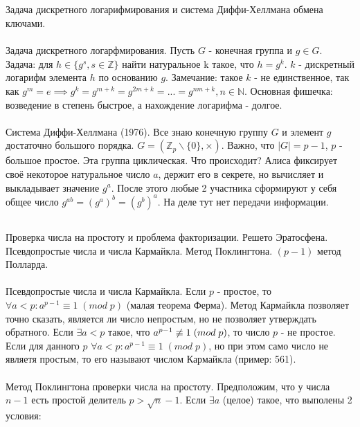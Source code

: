 \documentclass[a4paper,10pt]{article} %
\begin{document}
	\subsection{}
	Задача дискретного логарифмирования и система Диффи-Хеллмана обмена ключами.
	\\\\
	Задача дискретного логарфмирования. Пусть $G$ - конечная группа и $g \in G$.
	Задача: для $h \in \{g^{s}, s \in \mathbb{Z}\}$ найти натуральное k такое, что
	$h = g^{k}$. $k$ - дискретный логарифм элемента $h$ по основанию $g$.
	Замечание: такое $k$ - не единственное, так как $g^{m} = e \implies 
	g^{k} = g^{m + k} = g^{2m + k} = ... = g^{nm + k}, n \in \mathbb{N}$.
	Основная фишечка: возведение в степень быстрое, а нахождение логарифма - долгое.
	\\\\
	Система Диффи-Хеллмана (1976). Все знаю конечную группу $G$ и элемент $g$ достаточно большого порядка. $G = (\mathbb{Z}_{p}\backslash\{0\}, \times)$. 
	Важно, что $|G| = p - 1$, $p$ - большое простое. Эта группа циклическая.
	Что происходит? Алиса фиксирует своё некоторое натуральное число $a$, держит его в секрете, но вычисляет и выкладывает значение $g^{a}$. После этого любые 2 участника сформируют у себя общее число $g^{ab} = (g^{a})^{b} = (g^{b})^{a}$.
	На деле тут нет передачи информации. 
	\subsection{}
	\subsection{}
	\subsection{}
	\subsection{}
	\subsection{}
	Проверка числа на простоту и проблема факторизации. Решето Эратосфена.
	Псевдопростые числа и числа Кармайкла. Метод Поклингтона. $(p - 1)$ метод
	Полларда. 
	\\\\
	Псевдопростые числа и числа Кармайкла. Если $p$ - простое, то $\forall a < p:
	a^{p-1} \equiv 1 \; (mod \; p)$ (малая теорема Ферма). Метод Кармайкла позволяет точно сказать, является ли число непростым, но не позволяет утверждать обратного. Если $\exists a < p$ такое, что $a^{p - 1} \centernot\equiv 1 \; (mod \; p)$, то число $p$ - не простое. Если для данного 
	$p$ $\forall a < p: a^{p-1} \equiv 1 \; (mod \; p)$, но при этом само число не являетя простым, то его называют числом Кармайкла (пример: 561).  
	\\\\
	Метод Поклингтона проверки числа на простоту. Предположим, что у числа
	$n - 1$ есть простой делитель $p > \sqrt{n} - 1$. Если $\exists a$ (целое) такое, что выполены 2 условия:
	
\end{document}

